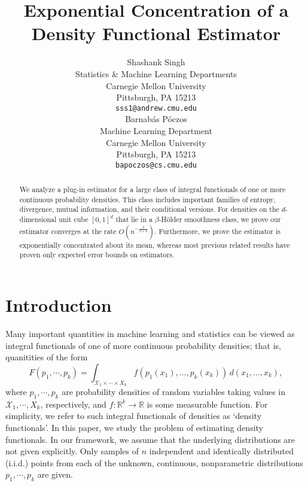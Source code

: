 \documentclass{article} %
\title{Exponential Concentration of a Density Functional Estimator}
\author{
Shashank Singh \\
Statistics \& Machine Learning Departments \\
Carnegie Mellon University \\
Pittsburgh, PA 15213 \\
\texttt{sss1@andrew.cmu.edu} \\
\And
Barnab\'as P\'oczos \\
Machine Learning Department \\
Carnegie Mellon University \\
Pittsburgh, PA 15213 \\
\texttt{bapoczos@cs.cmu.edu} \\
}
\newcommand{\R}{\mathbb{R}}                         %
\newcommand{\X}{\mathcal{X}}                        %
\begin{document}
\maketitle

\begin{abstract}
We analyze a plug-in estimator for a large class of integral functionals of one
or more continuous probability densities. This class includes important
families of entropy, divergence, mutual information, and their conditional
versions. For densities on the $d$-dimensional unit cube $[0,1]^d$ that lie in
a $\beta$-H\"older smoothness class, we prove our estimator converges at the
rate $O \left( n^{-\frac{\beta}{\beta + d}} \right)$. Furthermore, we prove
the estimator is exponentially concentrated about its mean, whereas most
previous related results have proven only expected error bounds on estimators.
\end{abstract}

\section{Introduction}
Many important quantities in machine learning and statistics can be viewed as
integral functionals of one of more continuous probability densities; that is,
quanitities of the form
\[F(p_1,\cdots,p_k)
    = \int_{\X_1 \times \cdots \times X_k}
        f(p_1(x_1),\dots,p_k(x_k)) \, d(x_1,\dots,x_k),\]
where $p_1,\cdots,p_k$ are probability densities of random variables taking
values in $\X_1,\cdots,X_k$, respectively, and $f : \R^k \to \R$ is some
measurable function. For simplicity, we refer to such integral functionals of
densities as `density functionals'. In this paper, we study the problem of
estimating density functionals. In our framework, we assume that the underlying
distributions are not given explicitly. Only samples of $n$ independent and
identically distributed (i.i.d.) points from each of the unknown, continuous,
nonparametric distributions $p_1,\cdots,p_k$ are given.
\end{document}
